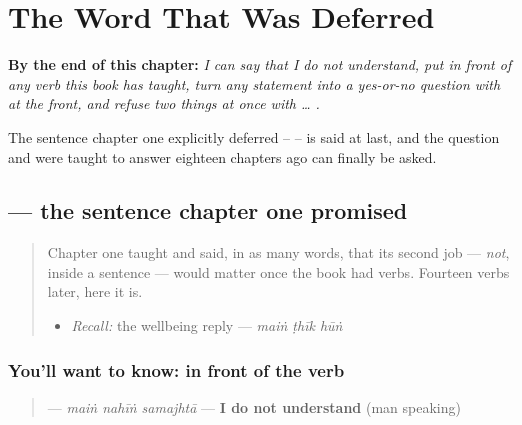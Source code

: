 
\chapter{The Word That Was Deferred}
\label{ch:ur-word-that-was-deferred}

\begin{chapteropening}
\textbf{By the end of this chapter:} \emph{I can say that I do not understand, put  in front of any verb this book has taught, turn any statement into a yes-or-no question with  at the front, and refuse two things at once with  … .}

The sentence chapter one explicitly deferred --    -- is said at last, and the question   and  were taught to answer eighteen chapters ago can finally be asked.
\end{chapteropening}

\section[\texorpdfstring{\ur{میں} \ur{نہیں} \ur{سمجھتا} (maiṅ nahīṅ samajhtā)}{میں نہیں سمجھتا (maiṅ nahīṅ samajhtā)}]{   — the sentence chapter one promised}

\label{lesson:UR-C19-nahin-verb}



\begin{quote}
Chapter one taught \textbf{} and said, in as many words, that its second job — \emph{not}, inside a sentence — would matter once the book had verbs. Fourteen verbs later, here it is.

\begin{itemize}
\raggedright
  \item \emph{Recall:} the wellbeing reply — \emph{maiṅ ṭhīk hūṅ}
\end{itemize}
\end{quote}

\subsection*{You'll want to know:  in front of the verb}
\begin{quote}
\textbf{  } — \emph{maiṅ nahīṅ samajhtā} — \textbf{I do not understand} (man speaking)
\end{quote}

